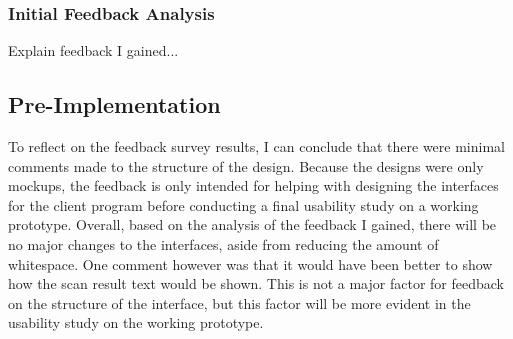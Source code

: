 \subsubsection{Initial Feedback Analysis}

Explain feedback I gained...

\subsection{Pre-Implementation}

To reflect on the feedback survey results, I can conclude that there were minimal comments made to the structure of the design. Because the designs were only mockups, the feedback is only intended for helping with designing the interfaces for the client program before conducting a final usability study on a working prototype. Overall, based on the analysis of the feedback I gained, there will be no major changes to the interfaces, aside from reducing the amount of whitespace. One comment however was that it would have been better to show how the scan result text would be shown. This is not a major factor for feedback on the structure of the interface, but this factor will be more evident in the usability study on the working prototype.
